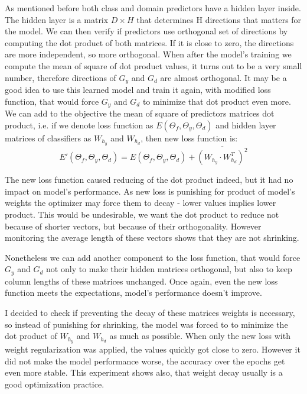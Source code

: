 \documentclass{article}
\begin{document}
\par
As mentioned before both class and domain predictors have a hidden layer inside. The hidden layer is a matrix $D \times H$ that determines H directions that matters for the model. We can then verify if predictors use orthogonal set of directions by computing the dot product of both matrices. If it is close to zero, the directions are more independent, so more orthogonal. When after the model's training we compute the mean of square of dot product values, it turns out to be a very small number, therefore directions of $G_{y}$ and $G_{d}$ are almost orthogonal. It may be a good idea to use this learned model and train it again, with modified loss function, that would force $G_{y}$ and $G_{d}$ to minimize that dot product even more. We can add to the objective the mean of square of predictors matrices dot product, i.e. if we denote loss function as $E(\Theta_{f}, \Theta_{y}, \Theta_{d})$ and hidden layer matrices of classifiers as $W_{h_{y}}$ and $W_{h_{d}}$, then new loss function is:
\begin{equation*}
E'(\Theta_{f}, \Theta_{y}, \Theta_{d}) = E(\Theta_{f}, \Theta_{y}, \Theta_{d}) + \overline{(W_{h_{y}} \cdot W_{h_{d}}^{T})^{2}}
\end{equation*}
\par
The new loss function caused reducing of the dot product indeed, but it had no impact on model's performance. As new loss is punishing for product of model's weights the optimizer may force them to decay - lower values implies lower product. This would be undesirable, we want the dot product to reduce not because of shorter vectors, but because of their orthogonality. However monitoring the average length of these vectors shows that they are not shrinking. 
\par
Nonetheless we can add another component to the loss function, that would force $G_{y}$ and $G_{d}$ not only to make their hidden matrices orthogonal, but also to keep column lengths of these matrices unchanged. Once again, even the new loss function meets the expectations, model's performance doesn't improve.
\par
I decided to check if preventing the decay of these matrices weights is necessary, so instead of punishing for shrinking, the model was forced to to minimize the dot product of $W_{h_{y}}$ and $W_{h_{d}}$ as much as possible. When only the new loss with weight regularization was applied, the values quickly got close to zero. However it did not make the model performance worse, the accuracy over the epochs get even more stable. This experiment shows also, that weight decay usually is a good optimization practice.
\end{document}
